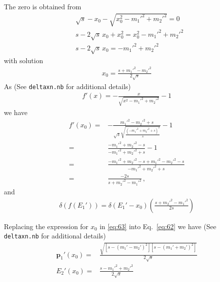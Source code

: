 The zero is obtained from
\begin{align}
  &\sqrt{s}-x_0-\sqrt{x_0^2-{m_1'}^2+{m_2'}^2}=0\nonumber\\
  &s-2\sqrt{s}\,x_0+x_0^2=x_0^2-{m_1'}^2+{m_2'}^2\nonumber\\
  &s-2\sqrt{s}\,x_0=-{m_1'}^2+{m_2'}^2
\end{align}
with solution
\begin{align}
  \label{eq:63}
  x_0=\frac{s+{m_1'}^2-{m_2'}^2}{2\sqrt{s}}
\end{align}
As (See 
\texttt{deltaxn.nb} %
for additional details)
\begin{align}
  f'(x)=-\frac{x}{\sqrt{x^2-{m_1'}^2+{m_2'}^2}}-1
\end{align}
we have
\begin{align}
  \label{eq:64}
  f'(x_0)=&-\frac{{m_1'}^2-{m_2'}^2+s}{\sqrt{s}
   \sqrt{\frac{\left(-{m_1'}^2+{m_2'}^2+s\right)^2}{s}}}-1\nonumber\\
    =&\frac{-{m_1'}^2+{m_2'}^2-s}{-{m_1'}^2+{m_2'}^2+s}-1\nonumber\\
    =&\frac{-{m_1'}^2+{m_2'}^2-s+{m_1'}^2-{m_2'}^2-s}{-{m_1'}^2+{m_2'}^2+s}\nonumber\\
=&\frac{-2s}{s+{m_2'}^2-{m_1'}^2}\,,
\end{align}
and
\begin{align}
  \label{eq:65}
  \delta(f(E_1'))=\delta(E_1'-x_0)\left(\frac{s+{m_2'}^2-{m_1'}^2}{2s}\right)
\end{align}

Replacing the expression for $x_0$ in \eqref{eq:63} into Eq.~\eqref{eq:62} we have (See 
\texttt{deltaxn.nb}  %
for additional details)
\begin{align}
  \label{eq:66}
   \mathbf{p}_1'(x_0)=&\frac{\sqrt{[s-({m_1'}-{m_2'})^2][s-({m_1'}+{m_2'})^2]}}{2\sqrt{s}}\nonumber\\
E_2'(x_0)=&  \frac{s-{m_1'}^2+{m_2'}^2}{2\sqrt{s}}
\end{align}


